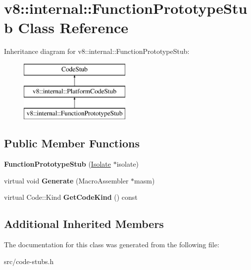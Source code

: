 \hypertarget{classv8_1_1internal_1_1_function_prototype_stub}{}\section{v8\+:\+:internal\+:\+:Function\+Prototype\+Stub Class Reference}
\label{classv8_1_1internal_1_1_function_prototype_stub}
Inheritance diagram for v8\+:\+:internal\+:\+:Function\+Prototype\+Stub\+:\begin{figure}[H]
\begin{center}
\leavevmode
\includegraphics[height=3.000000cm]{classv8_1_1internal_1_1_function_prototype_stub}
\end{center}
\end{figure}
\subsection*{Public Member Functions}
\begin{DoxyCompactItemize}
\item 
\hypertarget{classv8_1_1internal_1_1_function_prototype_stub_aba2aa90e53a7fee729926fe827451f8b}{}{\bfseries Function\+Prototype\+Stub} (\hyperlink{classv8_1_1internal_1_1_isolate}{Isolate} $\ast$isolate)\label{classv8_1_1internal_1_1_function_prototype_stub_aba2aa90e53a7fee729926fe827451f8b}

\item 
\hypertarget{classv8_1_1internal_1_1_function_prototype_stub_abfe9b4acc2bcea40d3ce2403b5500e1e}{}virtual void {\bfseries Generate} (Macro\+Assembler $\ast$masm)\label{classv8_1_1internal_1_1_function_prototype_stub_abfe9b4acc2bcea40d3ce2403b5500e1e}

\item 
\hypertarget{classv8_1_1internal_1_1_function_prototype_stub_a9a52ac599d4a45a04eb7fb65c3cb20a9}{}virtual Code\+::\+Kind {\bfseries Get\+Code\+Kind} () const \label{classv8_1_1internal_1_1_function_prototype_stub_a9a52ac599d4a45a04eb7fb65c3cb20a9}

\end{DoxyCompactItemize}
\subsection*{Additional Inherited Members}


The documentation for this class was generated from the following file\+:\begin{DoxyCompactItemize}
\item 
src/code-\/stubs.\+h\end{DoxyCompactItemize}
